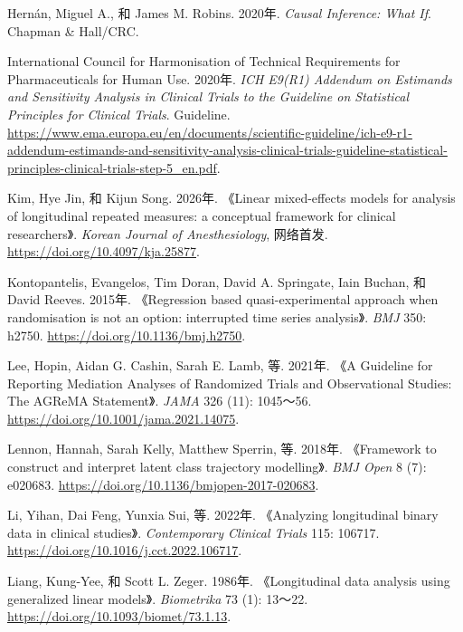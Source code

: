 \documentclass[
  chinese-hans,
  letterpaper,
  DIV=11,
  numbers=noendperiod]{scrreprt}
\newlength{\cslhangindent}
\newenvironment{CSLReferences}[2] %
 {\begin{list}{}{%
  \setlength{\itemindent}{0pt}
  \setlength{\leftmargin}{0pt}
  \setlength{\parsep}{0pt}
  \ifodd #1
   \setlength{\leftmargin}{\cslhangindent}
   \setlength{\itemindent}{-1\cslhangindent}
  \fi
  \setlength{\itemsep}{#2\baselineskip}}}
 {\end{list}}
\begin{document}
\begin{CSLReferences}{1}{1}
Hernán, Miguel A., 和 James M. Robins. 2020年. \emph{Causal Inference:
What If}. Chapman \& Hall/CRC.

International Council for Harmonisation of Technical Requirements for
Pharmaceuticals for Human Use. 2020年. \emph{{ICH E9(R1)} Addendum on
Estimands and Sensitivity Analysis in Clinical Trials to the Guideline
on Statistical Principles for Clinical Trials}. Guideline.
\url{https://www.ema.europa.eu/en/documents/scientific-guideline/ich-e9-r1-addendum-estimands-and-sensitivity-analysis-clinical-trials-guideline-statistical-principles-clinical-trials-step-5_en.pdf}.

Kim, Hye Jin, 和 Kijun Song. 2026年. {《Linear mixed-effects models for
analysis of longitudinal repeated measures: a conceptual framework for
clinical researchers》}. \emph{Korean Journal of Anesthesiology},
网络首发. \url{https://doi.org/10.4097/kja.25877}.

Kontopantelis, Evangelos, Tim Doran, David A. Springate, Iain Buchan, 和
David Reeves. 2015年. {《Regression based quasi-experimental approach
when randomisation is not an option: interrupted time series
analysis》}. \emph{BMJ} 350: h2750.
\url{https://doi.org/10.1136/bmj.h2750}.

Lee, Hopin, Aidan G. Cashin, Sarah E. Lamb, 等. 2021年. {《A Guideline
for Reporting Mediation Analyses of Randomized Trials and Observational
Studies: The {AGReMA} Statement》}. \emph{JAMA} 326 (11): 1045～56.
\url{https://doi.org/10.1001/jama.2021.14075}.

Lennon, Hannah, Sarah Kelly, Matthew Sperrin, 等. 2018年. {《Framework
to construct and interpret latent class trajectory modelling》}.
\emph{BMJ Open} 8 (7): e020683.
\url{https://doi.org/10.1136/bmjopen-2017-020683}.

Li, Yihan, Dai Feng, Yunxia Sui, 等. 2022年. {《Analyzing longitudinal
binary data in clinical studies》}. \emph{Contemporary Clinical Trials}
115: 106717. \url{https://doi.org/10.1016/j.cct.2022.106717}.

Liang, Kung-Yee, 和 Scott L. Zeger. 1986年. {《Longitudinal data
analysis using generalized linear models》}. \emph{Biometrika} 73 (1):
13～22. \url{https://doi.org/10.1093/biomet/73.1.13}.


\end{CSLReferences}
\end{document}
